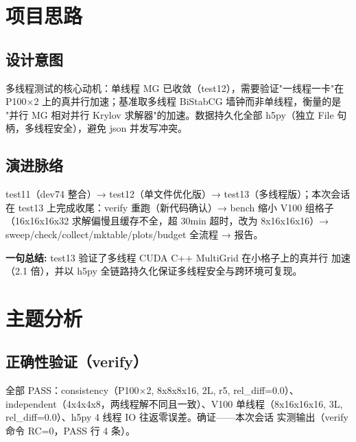 \documentclass[UTF8]{ctexart}
\begin{document}
\section{项目思路}
\subsection{设计意图}
多线程测试的核心动机：单线程 MG 已收敛（test12），需要验证"一线程一卡"在
P100×2 上的真并行加速；基准取多线程 BiStabCG 墙钟而非单线程，衡量的是
"并行 MG 相对并行 Krylov 求解器"的加速。数据持久化全部 h5py（独立 File
句柄，多线程安全），避免 json 并发写冲突。

\subsection{演进脉络}
test11（dev74 整合）→ test12（单文件优化版）→ test13（多线程版）；本次会话在
test13 上完成收尾：verify 重跑（新代码确认）→ bench 缩小 V100 组格子
（16x16x16x32 求解偏慢且缓存不全，超 30min 超时，改为 8x16x16x16）→
sweep/check/collect/mktable/plots/budget 全流程 → 报告。

\begin{ideabox}
\textbf{一句总结:} test13 验证了多线程 CUDA C++ MultiGrid 在小格子上的真并行
加速（2.1 倍），并以 h5py 全链路持久化保证多线程安全与跨环境可复现。
\end{ideabox}

\section{主题分析}
\subsection{正确性验证（verify）}
全部 PASS：consistency（P100×2, 8x8x8x16, 2L, r5, rel\_diff=0.0）、
independent（4x4x4x8，两线程解不同且一致）、V100 单线程（8x16x16x16, 3L,
rel\_diff=0.0）、h5py 4 线程 IO 往返零误差。\textcolor{struct}{确证}——本次会话
实测输出（verify 命令 RC=0，PASS 行 4 条）。
\end{document}
